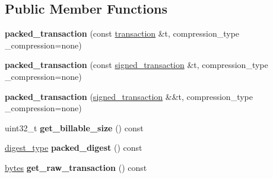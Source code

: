\subsection*{Public Member Functions}
\begin{DoxyCompactItemize}
\item 
\mbox{\label{structaacio_1_1chain_1_1packed__transaction_a9e220aa7ea721f2b114c15e6d72755b2}} 
{\bfseries packed\+\_\+transaction} (const \mbox{\hyperlink{structaacio_1_1chain_1_1transaction}{transaction}} \&t, compression\+\_\+type \+\_\+compression=none)
\item 
\mbox{\label{structaacio_1_1chain_1_1packed__transaction_a96d0c3f3b7ca2d9ae833ee6163971ba0}} 
{\bfseries packed\+\_\+transaction} (const \mbox{\hyperlink{structaacio_1_1chain_1_1signed__transaction}{signed\+\_\+transaction}} \&t, compression\+\_\+type \+\_\+compression=none)
\item 
\mbox{\label{structaacio_1_1chain_1_1packed__transaction_aed9707897167f92f102fda410dddc02b}} 
{\bfseries packed\+\_\+transaction} (\mbox{\hyperlink{structaacio_1_1chain_1_1signed__transaction}{signed\+\_\+transaction}} \&\&t, compression\+\_\+type \+\_\+compression=none)
\item 
\mbox{\label{structaacio_1_1chain_1_1packed__transaction_a46d51a8dc8f37a4d02e1bb2a717cc44c}} 
uint32\+\_\+t {\bfseries get\+\_\+billable\+\_\+size} () const
\item 
\mbox{\label{structaacio_1_1chain_1_1packed__transaction_a3b0f221b1bd0f7dfc44e1425fb5d1fe6}} 
\mbox{\hyperlink{classfc_1_1sha256}{digest\+\_\+type}} {\bfseries packed\+\_\+digest} () const
\item 
\mbox{\label{structaacio_1_1chain_1_1packed__transaction_aa4d325190a85247e5fb041d2d46da8bd}} 
\mbox{\hyperlink{classstd_1_1vector}{bytes}} {\bfseries get\+\_\+raw\+\_\+transaction} () const
\item 
\mbox{\label{structaacio_1_1chain_1_1packed__transaction_a4836278bfc08ee26365b36e9036fa26e}} 

\end{DoxyCompactItemize}
